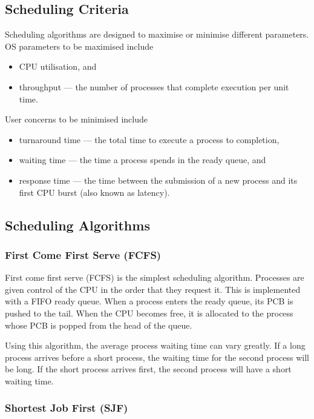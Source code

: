 \subsection{Scheduling Criteria}

Scheduling algorithms are designed to maximise or minimise different parameters.
OS parameters to be maximised include
\begin{itemize}
  \item CPU utilisation, and
  \item throughput --- the number of processes that complete execution per unit time.
\end{itemize}
User concerns to be minimised include
\begin{itemize}
  \item turnaround time --- the total time to execute a process to completion,
  \item waiting time --- the time a process spends in the ready queue, and
  \item response time --- the time between the submission of a new process and its first CPU burst (also known as latency).
\end{itemize}

\subsection{Scheduling Algorithms}

\subsubsection{First Come First Serve (FCFS)}

First come first serve (FCFS) is the simplest scheduling algorithm.
Processes are given control of the CPU in the order that they request it.
This is implemented with a FIFO ready queue.
When a process enters the ready queue, its PCB is pushed to the tail.
When the CPU becomes free, it is allocated to the process whose PCB is popped from the head of the queue.

Using this algorithm, the average process waiting time can vary greatly.
If a long process arrives before a short process, the waiting time for the second process will be long.
If the short process arrives first, the second process will have a short waiting time.

\subsubsection{Shortest Job First (SJF)}

